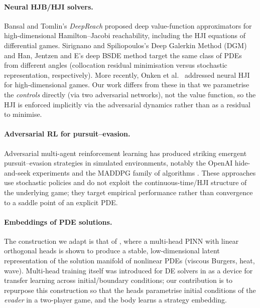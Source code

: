 \documentclass[11pt]{article}
\begin{document}
\paragraph{Neural HJB/HJI solvers.}
Bansal and Tomlin's \emph{DeepReach}
\citep{bansaltomlin2021deepreach} proposed deep value-function
approximators for high-dimensional Hamilton--Jacobi reachability,
including the HJI equations of differential games.  Sirignano and
Spiliopoulos's Deep Galerkin Method (DGM)
\citep{sirignano2018dgm} and Han, Jentzen and E's deep BSDE method
\citep{han2018deepbsde} target the same class of PDEs from
different angles (collocation residual minimisation versus stochastic
representation, respectively).  More recently, Onken et al.\
\citep{onken2021neuralhamiltonian} addressed neural HJI for
high-dimensional games.  Our work differs from these in that we
parametrise the \emph{controls} directly (via two adversarial
networks), not the value function, so the HJI is enforced implicitly
via the adversarial dynamics rather than as a residual to minimise.

\paragraph{Adversarial RL for pursuit--evasion.}
Adversarial multi-agent reinforcement learning has produced striking
emergent pursuit--evasion strategies in simulated environments,
notably the OpenAI hide-and-seek experiments
\citep{baker2020emergent} and the MADDPG family of algorithms
\citep{lowe2017maddpg}.  These approaches use stochastic policies and
do not exploit the continuous-time/HJI structure of the underlying
game; they target empirical performance rather than convergence to a
saddle point of an explicit PDE.

\paragraph{Embeddings of PDE solutions.}
The construction we adapt is that of
\citep{JimenezEmbeddings2026}, where a multi-head PINN with linear
orthogonal heads is shown to produce a stable, low-dimensional latent
representation of the solution manifold of nonlinear PDEs (viscous
Burgers, heat, wave).  Multi-head training itself was introduced for
DE solvers in \citep{Desai2022oneshot,Pellegrin2022transfer} as a
device for transfer learning across initial/boundary conditions; our
contribution is to repurpose this construction so that the heads
parametrise initial conditions of the \emph{evader} in a two-player
game, and the body learns a strategy embedding.
\end{document}
